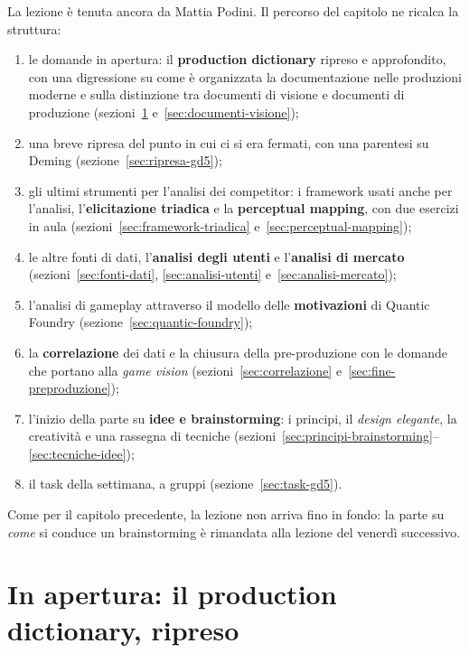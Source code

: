 La lezione è tenuta ancora da Mattia Podini. Il percorso del capitolo ne
ricalca la struttura:
\begin{enumerate}
  \item le domande in apertura: il \textbf{production dictionary} ripreso e
        approfondito, con una digressione su come è organizzata la
        documentazione nelle produzioni moderne e sulla distinzione tra
        documenti di visione e documenti di produzione
        (sezioni~\ref{sec:pd-ripreso} e~\ref{sec:documenti-visione});
  \item una breve ripresa del punto in cui ci si era fermati, con una
        parentesi su Deming (sezione~\ref{sec:ripresa-gd5});
  \item gli ultimi strumenti per l'analisi dei competitor: i framework usati
        anche per l'analisi, l'\textbf{elicitazione triadica} e la
        \textbf{perceptual mapping}, con due esercizi in aula
        (sezioni~\ref{sec:framework-triadica} e~\ref{sec:perceptual-mapping});
  \item le altre fonti di dati, l'\textbf{analisi degli utenti} e
        l'\textbf{analisi di mercato}
        (sezioni~\ref{sec:fonti-dati}, \ref{sec:analisi-utenti}
        e~\ref{sec:analisi-mercato});
  \item l'analisi di gameplay attraverso il modello delle
        \textbf{motivazioni} di Quantic Foundry
        (sezione~\ref{sec:quantic-foundry});
  \item la \textbf{correlazione} dei dati e la chiusura della pre-produzione
        con le domande che portano alla \emph{game vision}
        (sezioni~\ref{sec:correlazione} e~\ref{sec:fine-preproduzione});
  \item l'inizio della parte su \textbf{idee e brainstorming}: i principi, il
        \emph{design elegante}, la creatività e una rassegna di tecniche
        (sezioni~\ref{sec:principi-brainstorming}--\ref{sec:tecniche-idee});
  \item il task della settimana, a gruppi (sezione~\ref{sec:task-gd5}).
\end{enumerate}

Come per il capitolo precedente, la lezione non arriva fino in fondo: la
parte su \emph{come} si conduce un brainstorming è rimandata alla lezione
del venerdì successivo.

\section{In apertura: il production dictionary, ripreso}
\label{sec:pd-ripreso}

